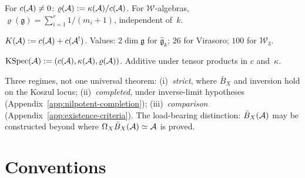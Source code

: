 \begin{definition}\label{def:anomaly-ratio}
For $c(\mathcal{A}) \neq 0$: $\varrho(\mathcal{A}) := \kappa(\mathcal{A})/c(\mathcal{A})$.
For $\mathcal{W}$-algebras,
$\varrho(\mathfrak{g}) = \sum_{i=1}^r 1/(m_i+1)$, independent
of~$k$.
\end{definition}

\begin{definition}\label{def:koszul-conductor}
$K(\mathcal{A}) := c(\mathcal{A}) + c(\mathcal{A}^!)$.  Values: $2\dim\mathfrak{g}$ for
$\widehat{\mathfrak{g}}_k$; $26$ for Virasoro; $100$ for
$\mathcal{W}_3$.
\end{definition}

\begin{definition}\label{def:koszul-spectrum}
$\operatorname{KSpec}(\mathcal{A}) := (c(\mathcal{A}), \kappa(\mathcal{A}),
\varrho(\mathcal{A}))$.  Additive under tensor products in $c$
and~$\kappa$.
\end{definition}

\begin{remark}\label{rem:existence-regimes}
\label{rem:existence-koszul}
Three regimes, not one universal theorem:
(i)~\emph{strict}, where $\bar{B}_X$ and inversion hold on the
Koszul locus;
(ii)~\emph{completed}, under inverse-limit hypotheses
(Appendix~\ref{app:nilpotent-completion});
(iii)~\emph{comparison}
(Appendix~\ref{app:existence-criteria}).
The load-bearing distinction: $\bar{B}_X(\mathcal{A})$ may be constructed
beyond where $\Omega_X\bar{B}_X(\mathcal{A}) \simeq \mathcal{A}$ is proved.
\end{remark}


\section{Conventions}
\label{sec:standing-assumptions}


